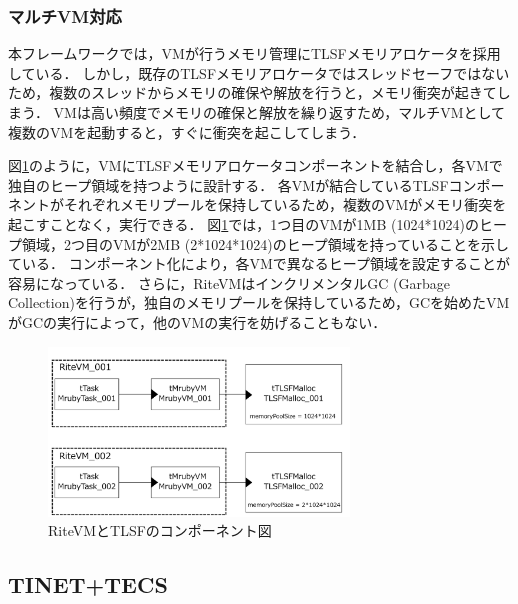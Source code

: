 \documentclass[submit,techrep]{ipsj_v2/UTF8/ipsj}
\begin{document}

\subsubsection{マルチVM対応}

本フレームワークでは，VMが行うメモリ管理にTLSFメモリアロケータを採用している．
しかし，既存のTLSFメモリアロケータではスレッドセーフではないため，複数のスレッドからメモリの確保や解放を行うと，メモリ衝突が起きてしまう．
VMは高い頻度でメモリの確保と解放を繰り返すため，マルチVMとして複数のVMを起動すると，すぐに衝突を起こしてしまう．

図\ref{fig:UseCase_mruby}のように，VMにTLSFメモリアロケータコンポーネントを結合し，各VMで独自のヒープ領域を持つように設計する．
各VMが結合しているTLSFコンポーネントがそれぞれメモリプールを保持しているため，複数のVMがメモリ衝突を起こすことなく，実行できる．
図\ref{fig:UseCase_mruby}では，1つ目のVMが1MB (1024*1024)のヒープ領域，2つ目のVMが2MB (2*1024*1024)のヒープ領域を持っていることを示している．
コンポーネント化により，各VMで異なるヒープ領域を設定することが容易になっている．
さらに，RiteVMはインクリメンタルGC (Garbage Collection)を行うが，独自のメモリプールを保持しているため，GCを始めたVMがGCの実行によって，他のVMの実行を妨げることもない．

\begin{figure}[t]
    \centering
    \includegraphics[width=8cm,clip]{figure/UseCase_mruby.pdf}
    \caption{RiteVMとTLSFのコンポーネント図}
    \label{fig:UseCase_mruby}
\end{figure}
    
\subsection{TINET+TECS}
\label{sec:TINET+TECS}
\end{document}

